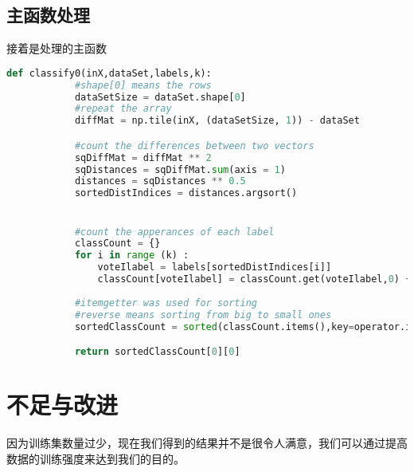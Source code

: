 \documentclass[11pt,twoside,a4paper]{article}
\begin{document}
    \subsection{主函数处理}
        接着是处理的主函数
        \begin{lstlisting}[language={Python}]
            def classify0(inX,dataSet,labels,k):
            #shape[0] means the rows
            dataSetSize = dataSet.shape[0]
            #repeat the array
            diffMat = np.tile(inX, (dataSetSize, 1)) - dataSet

            #count the differences between two vectors
            sqDiffMat = diffMat ** 2
            sqDistances = sqDiffMat.sum(axis = 1)
            distances = sqDistances ** 0.5
            sortedDistIndices = distances.argsort()


            #count the apperances of each label
            classCount = {}
            for i in range (k) :
                voteIlabel = labels[sortedDistIndices[i]]
                classCount[voteIlabel] = classCount.get(voteIlabel,0) + 1
            
            #itemgetter was used for sorting
            #reverse means sorting from big to small ones
            sortedClassCount = sorted(classCount.items(),key=operator.itemgetter(1),reverse = True)

            return sortedClassCount[0][0]
        \end{lstlisting}
    

        \section{不足与改进}
            因为训练集数量过少，现在我们得到的结果并不是很令人满意，我们可以通过提高数据的训练强度来达到我们的目的。
\end{document}
